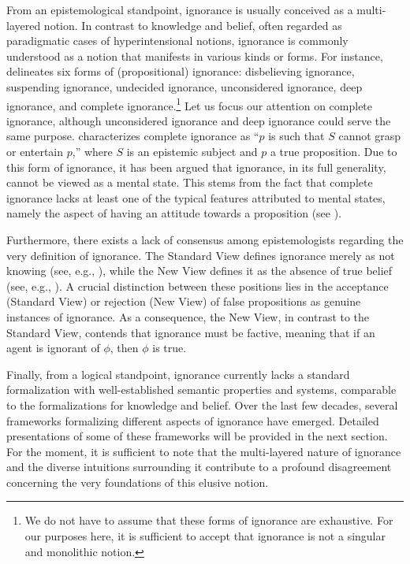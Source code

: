 \documentclass{article}
\begin{document}
From an epistemological standpoint, ignorance is usually conceived as a multi-layered notion. In contrast to knowledge and belief, often regarded as paradigmatic cases of hyperintensional notions, ignorance is commonly understood as a notion that manifests in various kinds or forms. For instance, \citet{Peels2020} delineates six forms of (propositional) ignorance: disbelieving ignorance, suspending ignorance, undecided ignorance, unconsidered ignorance, deep ignorance, and complete ignorance.\footnote{We do not have to assume that these forms of ignorance are exhaustive. For our purposes here, it is sufficient to accept that ignorance is not a singular and monolithic notion.} Let us focus our attention on complete ignorance, although unconsidered ignorance and deep ignorance could serve the same purpose.  \citet{Peels2020} characterizes complete ignorance as ``$p$ is such that $S$ cannot grasp or entertain $p$,'' where $S$ is an epistemic subject and $p$ a true proposition. Due to this form of ignorance, it has been argued that ignorance, in its full generality, cannot be viewed as a mental state. This stems from the fact that complete ignorance lacks at least one of the typical features attributed to mental states, namely the aspect of having an attitude towards a proposition (see \citet{Kubyshkina2020}).

Furthermore, there exists a lack of consensus among epistemologists regarding the very definition of ignorance.  The Standard View defines ignorance merely as not knowing (see, e.g., \citet{LeMorvan2012}), while the New View defines it as the absence of true belief (see, e.g., \citet{Peels2012}). A crucial distinction between these positions lies in the acceptance (Standard View) or rejection (New View) of false propositions as genuine instances of ignorance. As a consequence, the New View, in contrast to the Standard View, contends that ignorance must be factive, meaning that if an agent is ignorant of $\phi$, then $\phi$ is true.

Finally, from a logical standpoint, ignorance currently lacks a standard formalization with well-established semantic properties and systems, comparable to the formalizations for knowledge and belief. Over the last few decades, several frameworks formalizing different aspects of ignorance have emerged. Detailed presentations of some of these frameworks will be provided in the next section. For the moment, it is sufficient to note that the multi-layered nature of ignorance and the diverse intuitions surrounding it contribute to a profound disagreement concerning the very foundations of this elusive notion.
\end{document}
